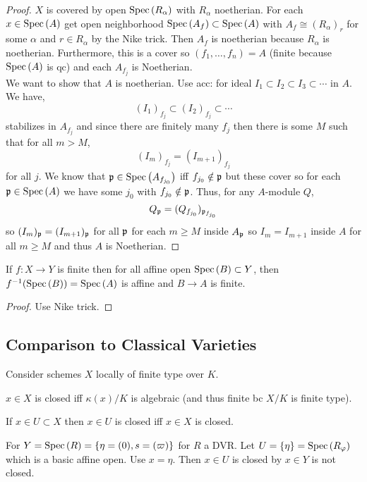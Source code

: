 \documentclass[12pt]{article}
\begin{document}
\begin{proof}
$X$ is covered by open $\mathrm{Spec}\left( R_\alpha \right)$ with $R_\alpha$ noetherian. For each $x \in \mathrm{Spec}\left( A \right)$ get open neighborhood $\mathrm{Spec}\left( A_f \right) \subset \mathrm{Spec}\left( A \right)$ with $A_f \cong (R_\alpha)_r$ for some $\alpha$ and $r \in R_\alpha$ by the Nike trick. Then $A_f$ is noetherian because $R_\alpha$ is noetherian. Furthermore, this is a cover so $(f_1, \dots, f_n) = A$ (finite because $\mathrm{Spec}\left( A \right)$ is qc) and each $A_{f_j}$ is Noetherian. 
\bigskip\\
We want to show that $A$ is noetherian. Use acc: for ideal $I_1 \subset I_2 \subset I_3 \subset \cdots$ in $A$. We have,
\[ (I_1)_{f_j} \subset (I_2)_{f_j} \subset \cdots \]
stabilizes in $A_{f_j}$ and since there are finitely many $f_j$ then there is some $M$ such that for all $m > M$,
\[ (I_m)_{f_j} = (I_{m+1})_{f_j} \]
for all $j$. We know that $\mathfrak{p} \in \mathrm{Spec}\left( A_{f_{j_0}} \right)$ iff $f_{j_0} \notin \mathfrak{p}$ but these cover so for each $\mathfrak{p} \in \mathrm{Spec}\left( A \right)$ we have some $j_0$ with $f_{j_0} \notin \mathfrak{p}$. Thus, for any $A$-module $Q$,
\[ Q_{\mathfrak{p}} = (Q_{f_{j_0}})_{\mathfrak{p}_{f_{j_0}}} \]
so $(I_m)_{\mathfrak{p}} = (I_{m+1})_{\mathfrak{p}}$ for all $\mathfrak{p}$ for each $m \ge M$ inside $A_{\mathfrak{p}}$ so $I_m = I_{m+1}$ inside $A$ for all $m \ge M$ and thus $A$ is Noetherian.
\end{proof}

\begin{thm}[Homework]
If $f : X \to Y$ is finite then for all affine open $\mathrm{Spec}\left( B \right) \subset Y$, then $f^{-1}(\mathrm{Spec}\left( B \right)) = \mathrm{Spec}\left( A \right)$ is affine and $B \to A$ is finite.
\end{thm}

\begin{proof}
Use Nike trick.
\end{proof}

\subsection{Comparison to Classical Varieties}

Consider schemes $X$ locally of finite type over $K$.

\begin{lemma}
$x \in X$ is closed iff $\kappa(x) / K$ is algebraic (and thus finite bc $X / K$ is finite type).
\end{lemma}

\begin{cor}
If $x \in U \subset X$ then $x \in U$ is closed iff $x \in X$ is closed.
\end{cor}

\begin{example}
For $Y = \mathrm{Spec}\left( R \right) = \{ \eta = (0), s = (\varpi) \}$ for $R$ a DVR. Let $U = \{ \eta \} = \mathrm{Spec}\left( R_{\varphi} \right)$ which is a basic affine open. Use $x = \eta$. Then $x \in U$ is closed by $x \in Y$ is not closed.
\end{example}
\end{document}
